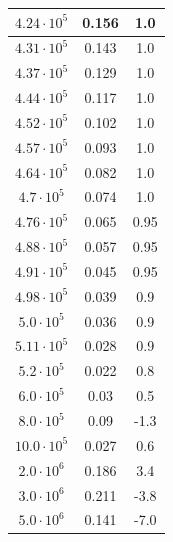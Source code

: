 \documentclass[a4paper,14pt]{article}
\begin{document}
\begin{longtable}{|c|c|c|}
$4.24 \cdot 10^5 $ & 0.156 & 1.0   \\ \hline
$4.31 \cdot 10^5 $ & 0.143 & 1.0   \\ \hline
$4.37 \cdot 10^5 $ & 0.129 & 1.0   \\ \hline
$4.44 \cdot 10^5 $ & 0.117 & 1.0   \\ \hline
$4.52 \cdot 10^5 $ & 0.102 & 1.0   \\ \hline
$4.57 \cdot 10^5 $ & 0.093 & 1.0   \\ \hline
$4.64 \cdot 10^5 $ & 0.082 & 1.0   \\ \hline
$4.7 \cdot 10^5 $ & 0.074 & 1.0   \\ \hline
$4.76 \cdot 10^5 $ & 0.065 & 0.95   \\ \hline
$4.88 \cdot 10^5 $ & 0.057 & 0.95   \\ \hline
$4.91 \cdot 10^5 $ & 0.045 & 0.95   \\ \hline
$4.98 \cdot 10^5 $ & 0.039 & 0.9   \\ \hline
$5.0 \cdot 10^5 $ & 0.036 & 0.9   \\ \hline
$5.11 \cdot 10^5 $ & 0.028 & 0.9   \\ \hline
$5.2 \cdot 10^5 $ & 0.022 & 0.8   \\ \hline
$6.0 \cdot 10^5 $ & 0.03 & 0.5   \\ \hline
$8.0 \cdot 10^5 $ & 0.09 & -1.3   \\ \hline
$10.0 \cdot 10^5 $ & 0.027 & 0.6   \\ \hline
$2.0 \cdot 10^6 $ & 0.186 & 3.4   \\ \hline
$3.0 \cdot 10^6 $ & 0.211 & -3.8   \\ \hline
$5.0 \cdot 10^6 $ & 0.141 & -7.0   \\ \hline


\end{longtable}
\end{document}
